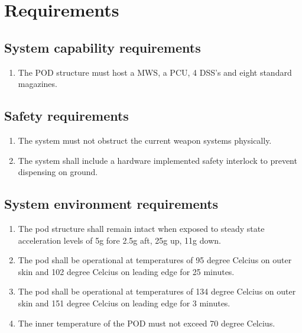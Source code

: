 \documentclass[Main]{subfiles}
\begin{document}
\setcounter{chapter}{2}
\chapter{Requirements}

\section{System capability requirements}
\begin{enumerate}[{SR}-1.1]
\item The POD structure must host a MWS, a PCU, 4 DSS's and eight standard magazines.

\end{enumerate}

\section{Safety requirements}
\begin{enumerate}[{SR}-2.1]
\item The system must not obstruct the current weapon systems physically.

\item The system shall include a hardware implemented safety interlock to prevent dispensing on ground.

\end{enumerate}

\section{System environment requirements}

\begin{enumerate}[{SR}-3.1]
\item The pod structure shall remain intact when exposed to steady state acceleration levels of 5g fore 2.5g aft, 25g up, 11g down.

\item The pod shall be operational at temperatures of 95 degree Celcius on outer skin and 102 degree Celcius on leading edge for 25 minutes.

\item The pod shall be operational at temperatures of 134 degree Celcius on outer skin and 151 degree Celcius on leading edge for 3 minutes.

\item The inner temperature of the POD must not exceed 70 degree Celcius.

\end{enumerate}
\end{document}
